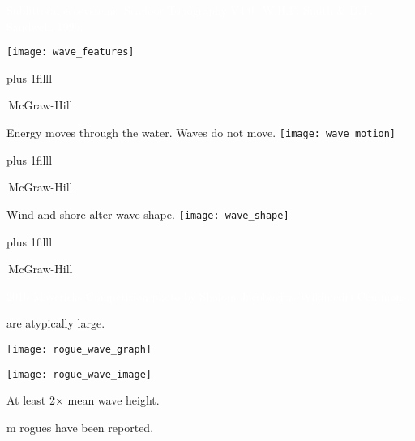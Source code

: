 \documentclass[t]{beamer}
\begin{document}

{
\begin{frame}[b]{\textcolor{white}{Sublittoral ecosystems.}}
\tiny\textcolor{white}{Seafloor Topography V4.0, \textcopyright\,W.H.F. Smith \& D.T. Sandwell, 1996.}
\end{frame}
}

\begin{frame}[t]{}
\texttt{[image: wave\_features]}

\vskip0pt plus 1filll

\tiny\textcopyright\,McGraw-Hill
\end{frame}


\begin{frame}[t]{Energy moves through the water. Waves do not move.}
\texttt{[image: wave\_motion]}

\vskip0pt plus 1filll

\tiny\textcopyright\,McGraw-Hill
\end{frame}

\begin{frame}[t]{Wind and shore alter wave shape.}
\texttt{[image: wave\_shape]}

\vskip0pt plus 1filll

\tiny\textcopyright\,McGraw-Hill
\end{frame}

{
\begin{frame}[b]

\tiny\textcolor{white}{2010 Mavericks Competition photo by Shalom Jacobovitz, Wikimedia Commons.}
\end{frame}
}

\begin{frame}[t]{ are atypically large.}
\vspace*{-\baselineskip}
\begin{multicols}{2}

	{\centering\texttt{[image: rogue\_wave\_graph]}

	\texttt{[image: rogue\_wave\_image]}\par}

\columnbreak
	\hangpara At least 2$\times$ mean wave height.
	
	 m rogues have been reported.
	
\end{multicols}
\end{frame}
\end{document}
